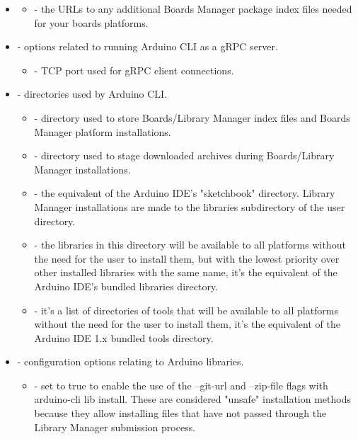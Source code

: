 \begin{itemize}
	\item {}
	\begin{itemize}
		\item {} - the URLs to any additional Boards Manager package index files needed for your boards platforms.
	\end{itemize}
	\item {} - options related to running Arduino CLI as a gRPC server.
	\begin{itemize}
		\item {} - TCP port used for gRPC client connections.
	\end{itemize}
	\item {} - directories used by Arduino CLI.
	\begin{itemize}
		\item {} - directory used to store Boards/Library Manager index files and Boards Manager platform installations.
		\item {} - directory used to stage downloaded archives during Boards/Library Manager installations.
		\item {} - the equivalent of the Arduino IDE's "sketchbook" directory. Library Manager installations are made to the libraries subdirectory of the user directory.
		\item {} - the libraries in this directory will be available to all platforms without the need for the user to install them, but with the lowest priority over other installed libraries with the same name, it's the equivalent of the Arduino IDE's bundled libraries directory.
		\item {} - it's a list of directories of tools that will be available to all platforms without the need for the user to install them, it's the equivalent of the Arduino IDE 1.x bundled tools directory.
	\end{itemize}
	    \item {} - configuration options relating to Arduino libraries.
	\begin{itemize}
		\item {} - set to true to enable the use of the --git-url and --zip-file flags with arduino-cli lib install. These are considered "unsafe" installation methods because they allow installing files that have not passed through the Library Manager submission process.

\end{itemize}
\end{itemize}
